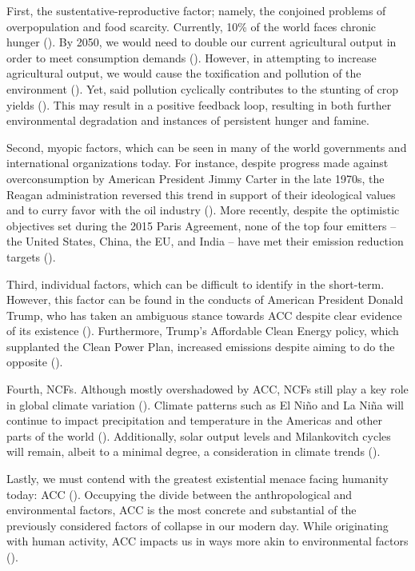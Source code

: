 \documentclass[12pt, a4paper, twoside]{article}
\begin{document}
First, the sustentative-reproductive factor; namely, the conjoined problems of overpopulation and food scarcity. Currently, 10\% of the world faces chronic hunger (\cite{omer2024hunger}). By 2050, we would need to double our current agricultural output in order to meet consumption demands (\cite{ranganathan2018feed10billion}). However, in attempting to increase agricultural output, we would cause the toxification and pollution of the environment (\cite[p.\ 3]{chowdhury2022agricultural}). Yet, said pollution cyclically contributes to the stunting of crop yields (\cite{jordan2022pollution}). This may result in a positive feedback loop, resulting in both further environmental degradation and instances of persistent hunger and famine. 

Second, myopic factors, which can be seen in many of the world governments and international organizations today. For instance, despite progress made against overconsumption by American President Jimmy Carter in the late 1970s, the Reagan administration reversed this trend in support of their ideological values and to curry favor with the oil industry (\cite{mckibben2021they}). More recently, despite the optimistic objectives set during the 2015 Paris Agreement, none of the top four emitters – the United States, China, the EU, and India – have met their emission reduction targets (\cite{bearak2022world}). 

Third, individual factors, which can be difficult to identify in the short-term. However, this factor can be found in the conducts of American President Donald Trump, who has taken an ambiguous stance towards ACC despite clear evidence of its existence (\cite{cheung2020trump}). Furthermore, Trump’s Affordable Clean Energy policy, which supplanted the Clean Power Plan, increased emissions despite aiming to do the opposite (\cite[p.\ 9]{keyes2019ace}). 

Fourth, NCFs. Although mostly overshadowed by ACC, NCFs still play a key role in global climate variation (\cite{shaftel2023vitalsigns}). Climate patterns such as El Niño and La Niña will continue to impact precipitation and temperature in the Americas and other parts of the world (\cite{halpert2014elnino}). Additionally, solar output levels and Milankovitch cycles will remain, albeit to a minimal degree, a consideration in climate trends (\cites{nasa2019sunrole}{nasa2020milankovitch}). 

Lastly, we must contend with the greatest existential menace facing humanity today: ACC (\cite{un2021biggestthreat}). Occupying the divide between the anthropological and environmental factors, ACC is the most concrete and substantial of the previously considered factors of collapse in our modern day. While originating with human activity, ACC impacts us in ways more akin to environmental factors (\cite[p.\ 896]{ipcc2014physical}). 
\end{document}
